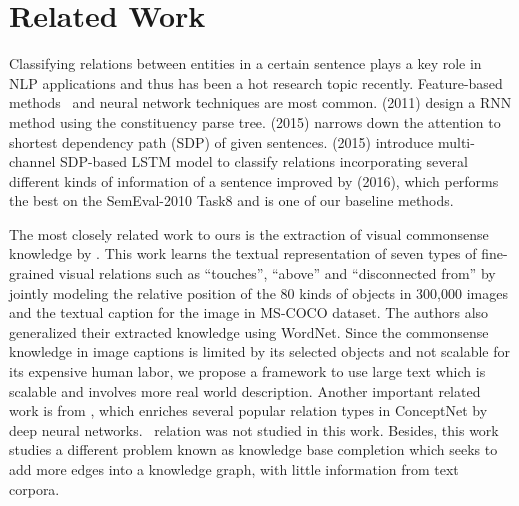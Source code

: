 \section{Related Work}
Classifying relations between entities in a certain sentence plays a key role in NLP applications and thus has been a hot research topic recently.
Feature-based methods~\cite{sem} and neural network techniques are most common. 
\citeauthor{socher2011semi} (2011) design a RNN method using the constituency parse tree. \citeauthor{ebrahimi2015chain} (2015) narrows down the attention to shortest dependency path (SDP) of given sentences. 
\citeauthor{xu2015classifying} (2015) introduce multi-channel SDP-based LSTM model to classify relations incorporating several different kinds of information of a sentence improved by \citeauthor{xu2016improved} (2016), which performs the best on the SemEval-2010 Task8 and is one of our baseline methods.

The most closely related work to ours is the extraction of
visual commonsense knowledge by \citeauthor{yatskar2016stating}. 
This work learns the textual representation of seven types of fine-grained 
visual relations such as ``touches'', ``above'' and ``disconnected from'' 
by jointly modeling the relative position of the 80 kinds of objects in 300,000 images
and the textual caption for the image in MS-COCO dataset\cite{lin2014microsoft}. 
The authors also generalized their extracted knowledge using WordNet. 
Since the commonsense knowledge in image captions is limited by its selected objects and not scalable for its expensive human labor, we propose a framework to use large text which is scalable and involves more real world description. 
Another important related work is from \citeauthor{li2016commonsense}, which enriches
several popular relation types in ConceptNet by deep neural networks.
\lnear~relation was not studied in this work. Besides, this work studies
a different problem known as knowledge base completion which seeks to
add more edges into a knowledge graph, with little information from
text corpora. 
